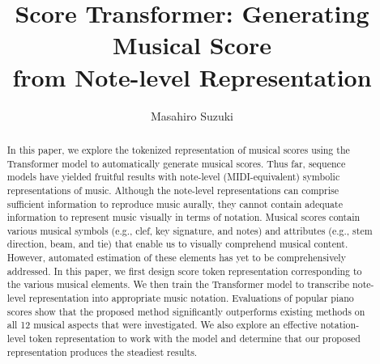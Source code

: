 \documentclass[sigconf]{acmart} %
\begin{document}
\title{Score Transformer: Generating Musical Score\\ from Note-level Representation}
\renewcommand{\shorttitle}{Score Transformer: Generating Musical Score from Note-level Representation}


\author{Masahiro Suzuki}

\renewcommand{\shortauthors}{Masahiro Suzuki}

\begin{abstract}
In this paper, we explore the tokenized representation of musical scores using the Transformer model to automatically generate musical scores. Thus far, sequence models have yielded fruitful results with note-level (MIDI-equivalent) symbolic representations of music. Although the note-level representations can comprise sufficient information to reproduce music aurally, they cannot contain adequate information to represent music visually in terms of notation. Musical scores contain various musical symbols (e.g., clef, key signature, and notes) and attributes (e.g., stem direction, beam, and tie) that enable us to visually comprehend musical content. However, automated estimation of these elements has yet to be comprehensively addressed. In this paper, we first design score token representation corresponding to the various musical elements. We then train the Transformer model to transcribe note-level representation into appropriate music notation. Evaluations of popular piano scores show that the proposed method significantly outperforms existing methods on all 12 musical aspects that were investigated. We also explore an effective notation-level token representation to work with the model and determine that our proposed representation produces the steadiest results.
\end{abstract}
\end{document}
